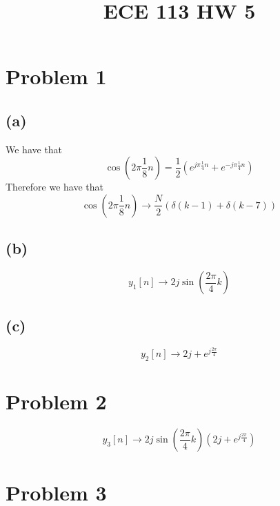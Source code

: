 
\title{ECE 113 HW 5}

\maketitle
\section*{Problem 1}
\subsection*{(a)}
We have that
$$\cos(2\pi\frac{1}{8}n)=\frac{1}{2}\left(e^{j\pi\frac{1}{4}n}+e^{-j\pi\frac{1}{4}n}\right)$$
Therefore we have that
$$\cos(2\pi\frac{1}{8}n)\to\boxed{\frac{N}{2}\left(\delta(k-1)+\delta(k-7)\right)}$$
\subsection*{(b)}
$$y_1[n]\to\boxed{2j\sin(\frac{2\pi}{4}k)}$$
\subsection*{(c)}
$$y_2[n]\to\boxed{2j+e^{j\frac{2\pi}{4}}}$$
\section*{Problem 2}
$$y_3[n]\to\boxed{2j\sin(\frac{2\pi}{4}k)\left(2j+e^{j\frac{2\pi}{4}}\right)}$$
\section*{Problem 3}

